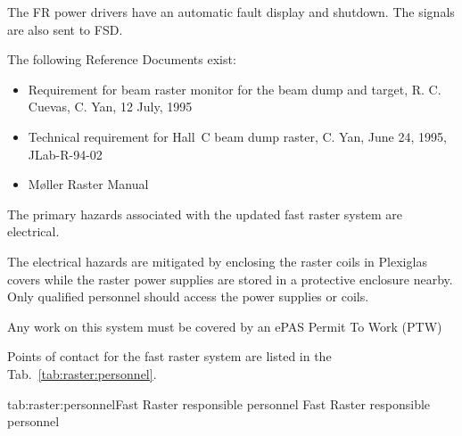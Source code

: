 \begin{safetyen}{0}{0}
\noindent The FR power drivers have an automatic fault display and
shutdown. The signals are also sent to FSD.

The following Reference Documents exist:
\begin{itemize}
\item{Requirement for beam raster monitor for the beam dump and target,
R. C. Cuevas, C. Yan, 12 July, 1995}
\item{Technical requirement for Hall~C beam dump raster,
C. Yan, June 24, 1995, JLab-R-94-02}

\item{M\o ller Raster Manual~\cite{docdb:moellerraster}}
\end{itemize}


The primary hazards associated with the updated fast raster system
are electrical. 


The electrical hazards are mitigated by enclosing the raster coils in
Plexiglas covers while the raster power supplies are stored in a
protective enclosure nearby. Only qualified personnel should access
the power supplies or coils. 

Any work on this system must be covered by an ePAS Permit To Work (PTW)


Points of contact for the fast raster system are listed in the Tab.~\ref{tab:raster:personnel}.
\begin{namestab}{tab:raster:personnel}{Fast Raster responsible personnel}{%
          Fast Raster responsible personnel}
\end{namestab}
\end{safetyen}

